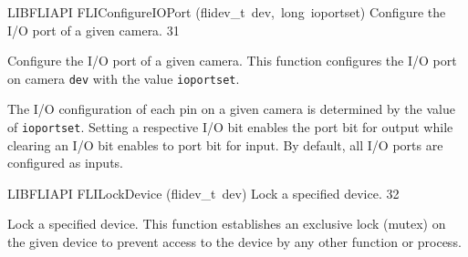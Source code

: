 \documentclass{article}
\begin{document}
\begin{cxxfunction}
{LIBFLIAPI}
        {FLIConfigureIOPort}
        {(flidev\_t\ dev,\ long\ ioportset)}
        {
 Configure the I/O port of a given camera.}
        {31}
\begin{cxxdoc}

Configure the I/O port of a given camera.  This function configures
the I/O port on camera \texttt{dev} with the value
\texttt{ioportset}.

The I/O configuration of each pin on a given camera is determined by the
value of \texttt{ioportset}.  Setting a respective I/O bit enables the
port bit for output while clearing an I/O bit enables to port bit for
input. By default, all I/O ports are configured as inputs.


\end{cxxdoc}
\end{cxxfunction}
\begin{cxxfunction}
{LIBFLIAPI}
        {FLILockDevice}
        {(flidev\_t\ dev)}
        {
 Lock a specified device.}
        {32}
\begin{cxxdoc}

Lock a specified device.  This function establishes an exclusive
lock (mutex) on the given device to prevent access to the device by
any other function or process.


\end{cxxdoc}
\end{cxxfunction}
\end{document}
